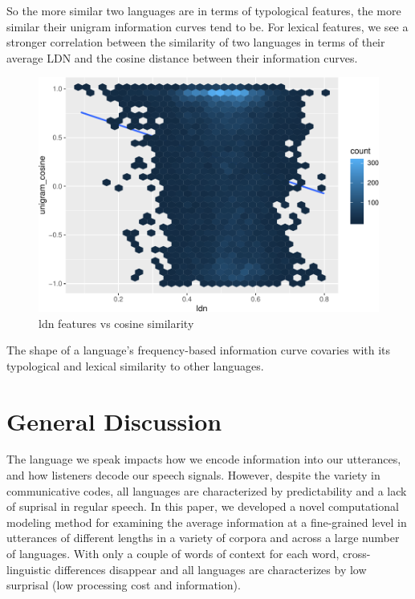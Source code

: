 \documentclass[11pt,]{article}
\begin{document}
So the more similar two languages are in terms of typological features, the more similar their unigram information curves tend to be. For lexical features, we see a stronger correlation between the similarity of two languages in terms of their average LDN and the cosine distance between their information curves.

\begin{figure}
\centering
\includegraphics{paper_files/figure-latex/unnamed-chunk-10-1.pdf}
\caption{\label{fig:unnamed-chunk-10}ldn features vs cosine similarity}
\end{figure}

The shape of a language's frequency-based information curve covaries with its typological and lexical similarity to other languages.

\hypertarget{general-discussion}{%
\section{General Discussion}\label{general-discussion}}

The language we speak impacts how we encode information into our utterances, and how listeners decode our speech signals. However, despite the variety in communicative codes, all languages are characterized by predictability and a lack of suprisal in regular speech. In this paper, we developed a novel computational modeling method for examining the average information at a fine-grained level in utterances of different lengths in a variety of corpora and across a large number of languages. With only a couple of words of context for each word, cross-linguistic differences disappear and all languages are characterizes by low surprisal (low processing cost and information).
\end{document}
